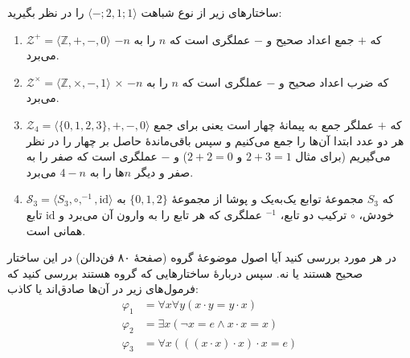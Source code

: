 ساختارهای زیر از نوع شباهت
$\langle\mathord{-};2,1;1\rangle$
را در نظر بگیرید:
\begin{enumerate}[label=(\alph*)]
    \item $\mathcal{Z^+}=\langle\mathbb{Z},+,-,0\rangle$
    که
    $+$ جمع اعداد صحیح و
    $-$ عملگری است که $n$ را به $-n$ می‌برد.
    \item $\mathcal{Z^\times}=\langle\mathbb{Z},\times,-, 1\rangle$
    $\times$ که ضرب اعداد صحیح و
    $-$ عملگری است که $n$ را به $-n$ می‌برد.
    \item $\mathcal{Z}_4=\langle\{0,1,2,3\},+,-, 0\rangle$
    که $+$ عملگر جمع به پیمانهٔ چهار است یعنی برای جمع هر دو عدد ابتدا آن‌ها را جمع می‌کنیم و سپس باقی‌ماندهٔ حاصل بر چهار را در نظر می‌گیریم
    (برای مثال
    $2+3=1$
    و
    $2+2=0$)
    و
    $-$
    عملگری است که صفر را به صفر و دیگر $n$ها را به $4-n$ می‌برد.
    \item $\mathcal{S}_3=\langle S_3, \circ,^{-1},\text{id}\rangle$
    که
    $S_3$
    مجموعهٔ توابع یک‌به‌یک و پوشا از مجموعهٔ
    $\{0,1,2\}$
    به خودش،
    $\circ$
    ترکیب دو تابع،
    $^{-1}$
    عملگری که هر تابع را به وارون آن می‌برد و
    $\text{id}$
    تابع همانی است.
\end{enumerate}
در هر مورد بررسی کنید آیا اصول موضوعهٔ گروه
(صفحهٔ ۸۰ فن‌دالن)
در این ساختار صحیح هستند یا نه. سپس دربارهٔ ساختارهایی که گروه هستند بررسی کنید که فرمول‌های زیر در آن‌ها صادق‌اند یا کاذب:
\begin{align*}
    \varphi_1 &= \forall x\forall y (x\cdot y = y\cdot x) \\
    \varphi_2 &= \exists x (\neg x = e \wedge x\cdot x = x) \\
    \varphi_3 &= \forall x (((x\cdot x)\cdot x)\cdot x = e)
\end{align*}
